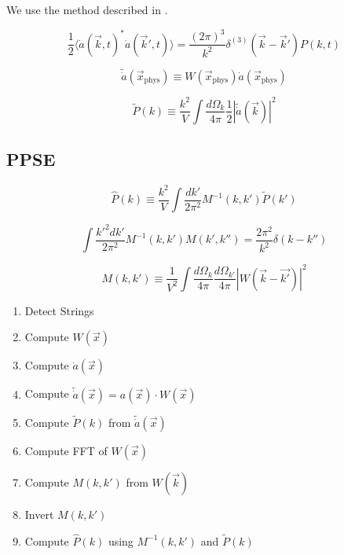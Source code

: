 \documentclass[a4paper]{article}
\begin{document}
We use the method described in \cite[sec. 3.2]{improved_estimation_hiramatsu}.

\begin{equation}
    \frac{1}{2} \langle \dot{a}(\vec{k}, t)^* \dot{a}(\vec{k}', t) \rangle = \frac{(2\pi)^3}{k^2} \delta^{(3)}(\vec{k} - \vec{k}') P(k, t)
\end{equation}

\begin{equation}
    \tilde{\dot{a}}(\vec{x}_\mathrm{phys}) \equiv W(\vec{x}_\mathrm{phys}) \dot{a}(\vec{x}_\mathrm{phys})
\end{equation}

\begin{equation}
    \tilde{P}(k) \equiv \frac{k^2}{V} \int \frac{d \Omega_k}{4\pi} \frac{1}{2} \left| \tilde{\dot{a}}( \vec{k} ) \right|^2
\end{equation}

\subsection{PPSE}

\begin{equation}
    \hat{P}(k) \equiv \frac{k^2}{V} \int \frac{d k'}{2 \pi^2} M^{-1}(k, k') \tilde{P}(k')
\end{equation}

\begin{equation}
    \int \frac{k'^2 d k'}{2 \pi^2} M^{-1}(k, k') M(k', k'') = \frac{2\pi^2}{k^2} \delta(k - k'')
\end{equation}

\begin{equation}
    M(k, k') \equiv \frac{1}{V^2} \int \frac{d \Omega_k}{4 \pi} \frac{d \Omega_{k'}}{4 \pi} \left| W(\vec{k} - \vec{k'}) \right|^2
\end{equation}

\begin{enumerate}
    \item Detect Strings
    \item Compute $W(\vec{x})$
    \item Compute $\dot{a}(\vec{x})$
    \item Compute $\tilde{\dot{a}}(\vec{x}) = a(\vec{x}) \cdot W(\vec{x})$
    \item Compute $\tilde{P}(k)$ from $\tilde{\dot{a}}(\vec{x})$
    \item Compute FFT of $W(\vec{x})$
    \item Compute $M(k, k')$ from $W(\vec{k})$
    \item Invert $M(k, k')$
    \item Compute $\hat{P}(k)$ using $M^{-1}(k, k')$ and $\tilde{P}(k)$
\end{enumerate}
\end{document}
